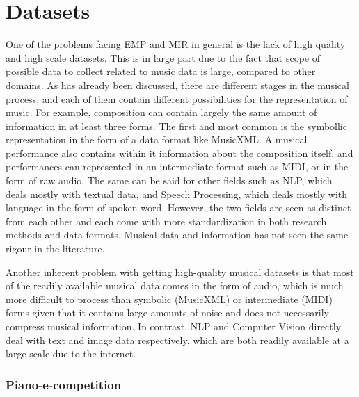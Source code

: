 \section{Datasets}
One of the problems facing EMP and MIR in general is the lack of high quality and high scale datasets\cite{cancino2018computational}. This is in large part due to the fact that scope of possible data to collect related to music data is large, compared to other domains. As has already been discussed, there are different stages in the musical process, and each of them contain different possibilities for the representation of music. For example, composition can contain largely the same amount of information in at least three forms. The first and most common is the symbollic representation in the form of a data format like MusicXML. A musical performance also contains within it information about the composition itself, and performances can represented in an intermediate format such as MIDI, or in the form of raw audio. The same can be said for other fields such as NLP, which deals mostly with textual data, and Speech Processing, which deals mostly with language in the form of spoken word. However, the two fields are seen as distinct from each other and each come with more standardization in both research methods and data formats. Musical data and information has not seen the same rigour in the literature. 

Another inherent problem with getting high-quality musical datasets is that most of the readily available musical data comes in the form of audio, which is much more difficult to process than symbolic (MusicXML) or intermediate (MIDI) forms given that it contains large amounts of noise and does not necessarily compress musical information. In contrast, NLP and Computer Vision directly deal with text and image data respectively, which are both readily available at a large scale due to the internet. 

\subsubsection{Piano-e-competition}

